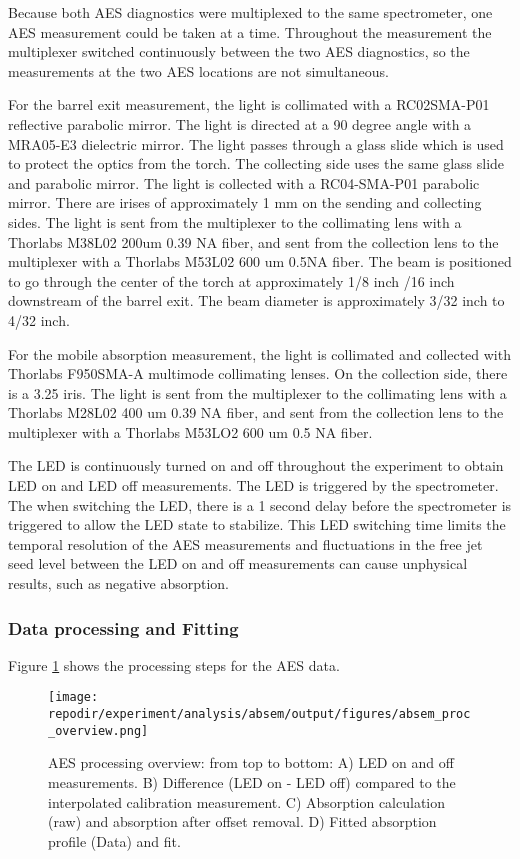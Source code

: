 Because both AES diagnostics were multiplexed to the same spectrometer, one AES measurement could be taken at a time. Throughout the measurement the multiplexer switched continuously between the two AES diagnostics, so the measurements at the two AES locations are not simultaneous.

For the barrel exit measurement, the light is collimated with a RC02SMA-P01 reflective parabolic mirror. The light is directed at a 90 degree angle with a MRA05-E3 dielectric mirror. The light passes through a glass slide which is used to protect the optics from the torch. The collecting side uses the same glass slide and parabolic mirror. The light is collected with a RC04-SMA-P01 parabolic mirror. There are irises of approximately 1 mm on the sending and collecting sides. The light is sent from the multiplexer to the collimating lens with a Thorlabs M38L02 200um 0.39 NA fiber, and sent from the collection lens to the multiplexer with a Thorlabs M53L02 600 um 0.5NA fiber. The beam is positioned to go through the center of the torch at approximately 1/8 inch /16 inch downstream of the barrel exit. The beam diameter is approximately 3/32 inch to 4/32 inch. 

For the mobile absorption measurement, the light is collimated and collected with Thorlabs F950SMA-A multimode collimating lenses.  On the collection side, there is a 3.25  iris. The light is sent from the multiplexer to the collimating lens with a Thorlabs M28L02 400 um 0.39 NA fiber, and sent from the collection lens to the multiplexer with a Thorlabs M53LO2 600 um 0.5 NA fiber. 

The LED is continuously turned on and off throughout the experiment to obtain LED on and LED off measurements. The LED is triggered by the spectrometer. The when switching the LED, there is a 1 second delay before the spectrometer is triggered to allow the LED state to stabilize. This LED switching time limits the temporal resolution of the AES measurements and fluctuations in the free jet seed level between the LED on and off measurements can cause unphysical results, such as negative absorption. 

\subsubsection{Data processing and Fitting}

Figure \ref{fig:SI_AES_proc_overview} shows the processing steps for the AES data.

\begin{figure}[]
    \centering
    \texttt{[image: \\repodir/experiment/analysis/absem/output/figures/absem\_proc\_overview.png]}
    \caption{AES processing overview: from top to bottom: A) LED on and off measurements. B) Difference (LED on - LED off) compared to the interpolated calibration measurement. C) Absorption calculation (raw) and absorption after offset removal. D) Fitted absorption profile (Data) and fit.}
    \label{fig:SI_AES_proc_overview}
\end{figure}


